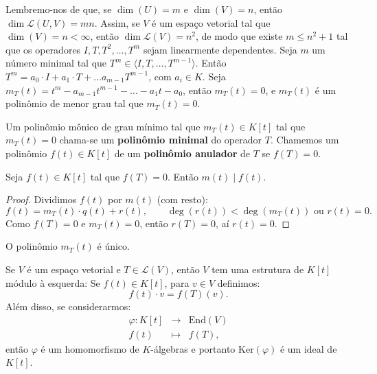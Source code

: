 \documentclass[11pt,twoside,a4paper]{book}
\begin{document}
\noindent
Lembremo-nos de que, se $\dim(U)=m$ e $\dim(V)=n$, então $\dim\mathcal{L}(U,V)=mn$. Assim, se $V$ é um espaço vetorial tal que $\dim(V)=n<\infty$, então $\dim\mathcal{L}(V)=n^2$, de modo que existe $m\leq n^2+1$ tal que os operadores $I,T,T^2,\dots,T^m$ sejam linearmente dependentes. Seja $m$ um número minimal tal que $T^m\in\langle I,T,\dots,T^{m-1}\rangle$. Então $T^m=a_0\cdot I+a_1\cdot T+\dots a_{m-1}T^{m-1}$, com $a_i\in K$. Seja $m_T(t)=t^m-a_{m-1}t^{m-1}-\dots-a_1t-a_0$, então $m_T(t)=0$, e $m_T(t)$ é um polinômio de menor grau tal que $m_T(t)=0$.

\begin{definicao}
Um polinômio mônico de grau mínimo tal que $m_T(t)\in K[t]$ tal que $m_T(t)=0$ chama-se um \textbf{polinômio minimal} do operador $T$. Chamemos um polinômio $f(t)\in K[t]$ de um \textbf{polinômio anulador} de $T$ se $f(T)=0$.
\end{definicao}

\begin{lema}
Seja $f(t)\in K[t]$ tal que $f(T)=0$. Então $m(t)\mid f(t)$.
\end{lema}
\begin{proof}
Dividimos $f(t)$ por $m(t)$ (com resto):
\[
f(t)=m_T(t)\cdot q(t)+r(t),\quad\quad\deg(r(t))<\deg(m_T(t))\text{ ou }r(t)=0.
\]
Como $f(T)=0$ e $m_T(t)=0$, então $r(T)=0$, aí $r(t)=0$.
\end{proof}

\begin{corolario}
O polinômio $m_T(t)$ é único.
\end{corolario}

\noindent
Se $V$ é um espaço vetorial e $T\in\mathcal{L}(V)$, então $V$ tem uma estrutura de $K[t]$ módulo à esquerda: Se $f(t)\in K[t]$, para $v\in V$ definimos:
\[
f(t)\cdot v=f(T)(v).
\]
Além disso, se considerarmos:
\[
\begin{array}{rcl}
\varphi:K[t]&\rightarrow&\mathrm{End}(V)\\f(t)&\mapsto&f(T),
\end{array}
\]
então $\varphi$ é um homomorfismo de $K$-álgebras e portanto $\mathrm{Ker}(\varphi)$ é um ideal de $K[t]$.
\end{document}
